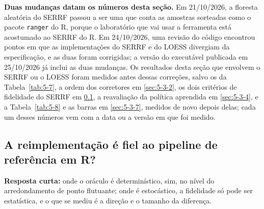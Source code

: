 
\textbf{Duas mudanças datam os números desta seção.} Em 21/10/2026, a floresta aleatória do SERRF passou a ser uma que conta as amostras sorteadas como o pacote \texttt{ranger} do R, porque o laboratório que vai usar a ferramenta está acostumado ao SERRF do R. Em 24/10/2026, uma revisão do código encontrou pontos em que as implementações do SERRF e do LOESS divergiam da especificação, e as duas foram corrigidas; a versão do executável publicada em 25/10/2026 já inclui as duas mudanças. Os resultados desta seção que envolvem o SERRF ou o LOESS foram medidos antes dessas correções, salvo os da Tabela~\ref{tab:5-7}, a ordem dos corretores em \ref{sec:5-3-2}, os dois critérios de fidelidade do SERRF em \ref{sec:5-3-1}, a reavaliação da política aprendida em \ref{sec:5-3-4}, e a Tabela~\ref{tab:5-8} e as barras em \ref{sec:5-3-7}, medidos de novo depois delas; cada um desses números vem com a data ou a versão em que foi medido.


\subsection{A reimplementação é fiel ao pipeline de referência em R?}\label{sec:5-3-1}

\textbf{Resposta curta:} onde o oráculo é determinístico, sim, no nível do arredondamento de ponto flutuante; onde é estocástico, a fidelidade só pode ser estatística, e o que se mediu é a direção e o tamanho da diferença.

